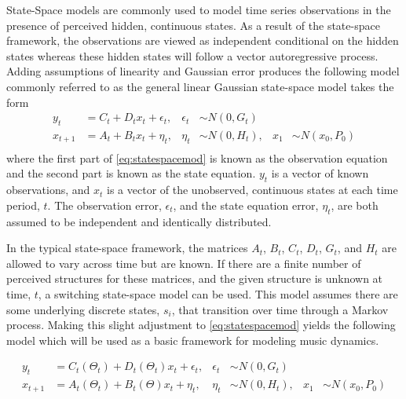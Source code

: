 \documentclass[12pt]{article}
\begin{document}
State-Space models are commonly used to model time series observations
in the presence of perceived hidden, continuous states. As a result of
the state-space framework, the observations are viewed as independent
conditional on the hidden states whereas these hidden states will follow
a vector autoregressive process. Adding assumptions of linearity and
Gaussian error produces the following model commonly referred to as the
general linear Gaussian state-space model \citet{durbin_time_2012} takes
the form \begin{equation}
  \begin{aligned}
    y_t &= C_t + D_tx_t + \epsilon_t, 
    & \epsilon_t & \sim N(0,G_t)\\
    x_{t+1} &= A_t + B_tx_t + \eta_t, 
    & \eta_t & \sim N(0,H_t), 
    & x_1 & \sim N(x_0,P_0) \\
  \end{aligned}
  \label{eq:statespacemod}
\end{equation} where the first part of \autoref{eq:statespacemod} is
known as the observation equation and the second part is known as the
state equation. \(y_t\) is a vector of known observations, and \(x_t\)
is a vector of the unobserved, continuous states at each time period,
\(t\). The observation error, \(\epsilon_t\), and the state equation
error, \(\eta_t\), are both assumed to be independent and identically
distributed.

In the typical state-space framework, the matrices \(A_t\), \(B_t\),
\(C_t\), \(D_t\), \(G_t\), and \(H_t\) are allowed to vary across time
but are known. If there are a finite number of perceived structures for
these matrices, and the given structure is unknown at time, \(t\), a
switching state-space model can be used. This model assumes there are
some underlying discrete states, \(s_i\), that transition over time
through a Markov process. Making this slight adjustment to
\autoref{eq:statespacemod} yields the following model which will be used
as a basic framework for modeling music dynamics.

\begin{equation}
  \begin{aligned}
    y_t &= C_t(\Theta_t) + D_t(\Theta_t)x_t + \epsilon_t, 
    & \epsilon_t & \sim N(0,G_t)\\
    x_{t+1} &= A_t(\Theta_t) + B_t(\Theta)x_t + \eta_t, 
    & \eta_t & \sim N(0,H_t), 
    & x_1 & \sim N(x_0,P_0) \\
  \end{aligned}
  \label{eq:switchstatemodel}
\end{equation}
\end{document}
